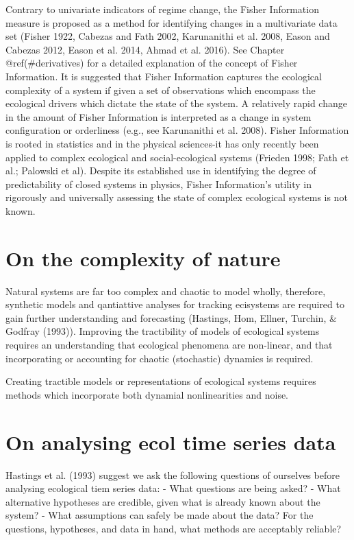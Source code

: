 \documentclass[12pt,twoside,openany]{reedthesis}
\begin{document}
Contrary to univariate indicators of regime change, the Fisher
Information measure is proposed as a method for identifying changes in a
multivariate data set (Fisher 1922, Cabezas and Fath 2002, Karunanithi
et al. 2008, Eason and Cabezas 2012, Eason et al. 2014, Ahmad et al.
2016). See Chapter @ref(\#derivatives) for a detailed explanation of the
concept of Fisher Information. It is suggested that Fisher Information
captures the ecological complexity of a system if given a set of
observations which encompass the ecological drivers which dictate the
state of the system. A relatively rapid change in the amount of Fisher
Information is interpreted as a change in system configuration or
orderliness (e.g., see Karunanithi et al. 2008). Fisher Information is
rooted in statistics and in the physical sciences-it has only recently
been applied to complex ecological and social-ecological systems
(Frieden 1998; Fath et al.; Palowski et al). Despite its established use
in identifying the degree of predictability of closed systems in
physics, Fisher Information's utility in rigorously and universally
assessing the state of complex ecological systems is not known.

\section{On the complexity of nature}\label{on-the-complexity-of-nature}

Natural systems are far too complex and chaotic to model wholly,
therefore, synthetic models and qantiattive analyses for tracking
ecisystems are required to gain further understanding and forecasting
(Hastings, Hom, Ellner, Turchin, \& Godfray (1993)). Improving the
tractibility of models of ecological systems requires an understanding
that ecological phenomena are non-linear, and that incorporating or
accounting for chaotic (stochastic) dynamics is required.

Creating tractible models or representations of ecological systems
requires methods which incorporate both dynamial nonlinearities and
noise.

\section{On analysing ecol time series
data}\label{on-analysing-ecol-time-series-data}

Hastings et al. (1993) suggest we ask the following questions of
ourselves before analysing ecological tiem series data: - What questions
are being asked? - What alternative hypotheses are credible, given what
is already known about the system? - What assumptions can safely be made
about the data? For the questions, hypotheses, and data in hand, what
methods are acceptably reliable?
\end{document}
